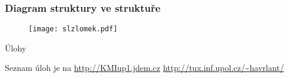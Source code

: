 \documentclass{beamer}
\begin{document}
\begin{frame}[t,fragile]\frametitle{Diagram struktury ve struktuře} 
\begin{figure}[htb]
\centering
\texttt{[image: slzlomek.pdf]}
\end{figure}
\end{frame}


\begin{frame}[t,fragile]{Úlohy}
\begin{center}
\vskip 1cm
{\Large Seznam úloh je na \url{http://KMIup1.jdem.cz}}
\vskip 2cm
\url{http://tux.inf.upol.cz/~havrlant/}
\end{center}
\end{frame}
\end{document}
